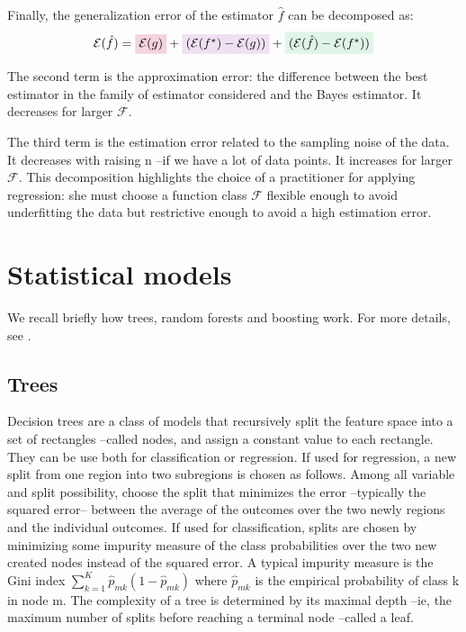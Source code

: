 \documentclass[french,12pt,twoside,a4paper]{book}
\newcommand{\highlight}[2]{\colorbox{#1!17}{$\displaystyle #2$}}
\renewcommand{\highlight}[2]{\colorbox{#1!17}{#2}}
\begin{document}
\begin{appendices}
  Finally, the generalization error of the estimator $\hat f$ can be decomposed as:
  \begin{equation}
    \mathcal{E}(\hat f) = \highlight{bayes_error}{\color{black} $\mathcal{E}(g)$} +
    \highlight{approximation_error}{$(\mathcal{E}(f^{\star}) - \mathcal{E}(g))$} +
    \highlight{estimation_error}{$(\mathcal{E}(\hat{f}) - \mathcal{E}(f^{\star}))$}
  \end{equation}


  The \highlight{approximation_error}{second term} is the approximation error: the difference between the best
  estimator in the family of estimator considered and the Bayes estimator. It
  decreases for larger $\mathcal{F}$.

  The \highlight{estimation_error}{third term} is the estimation error related to the
  sampling noise of the data. It decreases with raising n --if we have a lot of
  data points. It increases for larger $\mathcal{F}$. This decomposition
  highlights the choice of a practitioner for applying regression: she must
  choose a function class $\mathcal{F}$ flexible enough to avoid underfitting
  the data but restrictive enough to avoid a high estimation error.

  \section{Statistical models}\label{apd:intro:statistical_models}

  We recall briefly how trees, random forests and boosting work. For more
  details, see \citep{hastie2009elements}.

  \subsection{Trees}\label{apd:intro:trees}

  Decision trees are a class of models that recursively split the feature space
  into a set of rectangles --called nodes, and assign a constant value to each
  rectangle. They can be use both for classification or regression. If used for
  regression, a new split from one region into two subregions is chosen as
  follows. Among all variable and split possibility, choose the split that
  minimizes the error --typically the squared error-- between the average of the
  outcomes over the two newly regions and the individual outcomes. If used for
  classification, splits are chosen by minimizing some impurity measure of the
  class probabilities over the two new created nodes instead of the squared
  error. A typical impurity measure is the Gini index $\sum_{k=1}^K \hat p_{mk}
    (1-\hat p_{mk})$ where $\hat p_{mk}$ is the empirical probability of class k
  in node m. The complexity of a tree is determined by its maximal depth --ie,
  the maximum number of splits before reaching a terminal node --called a leaf.


\end{appendices}
\end{document}
